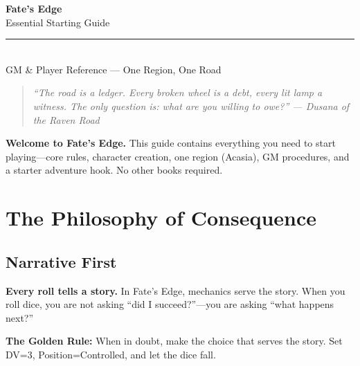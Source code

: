 \documentclass[10pt,twocolumn]{article} %
\begin{document}

\begin{center}
    {\Huge\bfseries\sffamily\color{edgered} Fate's Edge}\\[0.2em]
    {\large\sffamily Essential Starting Guide}\\[0.5em]
    \rule{0.7\textwidth}{0.5pt}\\[0.8em]
    {\large\sffamily GM \& Player Reference — One Region, One Road}\\[1em]
    \begin{quote}
        \itshape ``The road is a ledger. Every broken wheel is a debt, every lit lamp a witness. The only question is: what are you willing to owe?''
        \hfill — Dusana of the Raven Road
    \end{quote}
    \begin{sidebar}
        \textbf{Welcome to Fate's Edge.} This guide contains everything you need to start playing—core rules, character creation, one region (Acasia), GM procedures, and a starter adventure hook. No other books required.
    \end{sidebar}
\end{center}
\vspace{1em}

\section{The Philosophy of Consequence}

\subsection{Narrative First}
\textbf{Every roll tells a story.} In Fate's Edge, mechanics serve the story. When you roll dice, you are not asking ``did I succeed?''—you are asking ``what happens next?''

\begin{sidebar}
    \textbf{The Golden Rule:} When in doubt, make the choice that serves the story. Set DV=3, Position=Controlled, and let the dice fall.
\end{sidebar}
\end{document}
